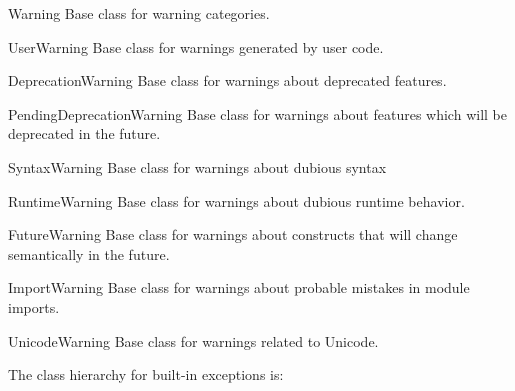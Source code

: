 \begin{excdesc}{Warning}
Base class for warning categories.
\end{excdesc}

\begin{excdesc}{UserWarning}
Base class for warnings generated by user code.
\end{excdesc}

\begin{excdesc}{DeprecationWarning}
Base class for warnings about deprecated features.
\end{excdesc}

\begin{excdesc}{PendingDeprecationWarning}
Base class for warnings about features which will be deprecated in the future.
\end{excdesc}

\begin{excdesc}{SyntaxWarning}
Base class for warnings about dubious syntax
\end{excdesc}

\begin{excdesc}{RuntimeWarning}
Base class for warnings about dubious runtime behavior.
\end{excdesc}

\begin{excdesc}{FutureWarning}
Base class for warnings about constructs that will change semantically
in the future.
\end{excdesc}

\begin{excdesc}{ImportWarning}
Base class for warnings about probable mistakes in module imports.
\end{excdesc}

\begin{excdesc}{UnicodeWarning}
Base class for warnings related to Unicode.
\end{excdesc}

The class hierarchy for built-in exceptions is:


